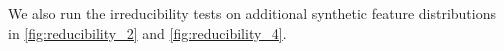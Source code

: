 \documentclass{article} %
\theoremstyle{plain}
\theoremstyle{definition}
\begin{document}
We also run the irreducibility tests on additional synthetic feature distributions in \cref{fig:reducibility_2} and \cref{fig:reducibility_4}.
\end{document}
